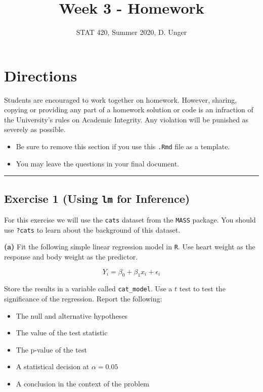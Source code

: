 \documentclass[
]{article}
\title{Week 3 - Homework}
\author{STAT 420, Summer 2020, D. Unger}
\date{}
\providecommand{\tightlist}{%
  \setlength{\itemsep}{0pt}\setlength{\parskip}{0pt}}
\begin{document}
\maketitle

\hypertarget{directions}{%
\section{Directions}\label{directions}}

Students are encouraged to work together on homework. However, sharing,
copying or providing any part of a homework solution or code is an
infraction of the University's rules on Academic Integrity. Any
violation will be punished as severely as possible.

\begin{itemize}
\tightlist
\item
  Be sure to remove this section if you use this \texttt{.Rmd} file as a
  template.
\item
  You may leave the questions in your final document.
\end{itemize}

\begin{center}\rule{0.5\linewidth}{0.5pt}\end{center}

\hypertarget{exercise-1-using-lm-for-inference}{%
\subsection{\texorpdfstring{Exercise 1 (Using \texttt{lm} for
Inference)}{Exercise 1 (Using lm for Inference)}}\label{exercise-1-using-lm-for-inference}}

For this exercise we will use the \texttt{cats} dataset from the
\texttt{MASS} package. You should use \texttt{?cats} to learn about the
background of this dataset.

\textbf{(a)} Fit the following simple linear regression model in
\texttt{R}. Use heart weight as the response and body weight as the
predictor.

\[
Y_i = \beta_0 + \beta_1 x_i + \epsilon_i
\]

Store the results in a variable called \texttt{cat\_model}. Use a \(t\)
test to test the significance of the regression. Report the following:

\begin{itemize}
\tightlist
\item
  The null and alternative hypotheses
\item
  The value of the test statistic
\item
  The p-value of the test
\item
  A statistical decision at \(\alpha = 0.05\)
\item
  A conclusion in the context of the problem
\end{itemize}
\end{document}
